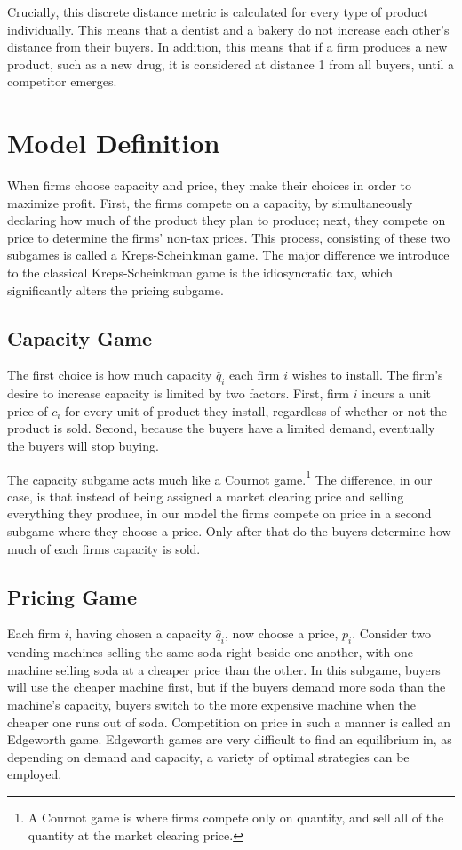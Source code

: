 \documentclass[11pt]{article}
\begin{document}
Crucially, this discrete distance metric is calculated for every type of
product individually. This means that a dentist and a bakery do not increase
each other's distance from their buyers. In addition, this means that if a firm
produces a new product, such as a new drug, it is considered at distance 1 from
all buyers, until a competitor emerges.

\section{Model Definition}
When firms choose capacity and price, they make their choices in order to
maximize profit. First, the firms compete on a capacity, by simultaneously
declaring how much of the product they plan to produce; next, they compete on
price to determine the firms' non-tax prices. This process, consisting of these
two subgames is called a Kreps-Scheinkman game. The major difference we
introduce to the classical Kreps-Scheinkman game is the idiosyncratic tax,
which significantly alters the pricing subgame.

\subsection{Capacity Game}
The first choice is how much capacity $\hat q_i$ each firm $i$ wishes to
install. The firm's desire to increase capacity is limited by two factors.
First, firm $i$ incurs a unit price of $c_i$ for every unit of product they
install, regardless of whether or not the product is sold. Second, because the
buyers have a limited demand, eventually the buyers will stop buying.

The capacity subgame acts much like a Cournot game.\footnote{A Cournot game is
where firms compete only on quantity, and sell all of the quantity at the
market clearing price.} The difference, in our case, is that instead of being
assigned a market clearing price and selling everything they produce, in our
model the firms compete on price in a second subgame where they choose a price.
Only after that do the buyers determine how much of each firms capacity is
sold.

\subsection{Pricing Game}
Each firm $i$, having chosen a capacity $\hat q_i$, now choose a price, $p_i$.
Consider two vending machines selling the same soda right beside one another,
with one machine selling soda at a cheaper price than the other. In this
subgame, buyers will use the cheaper machine first, but if the buyers demand
more soda than the machine's capacity, buyers switch to the more expensive
machine when the cheaper one runs out of soda. Competition on price in such a
manner is called an Edgeworth game. Edgeworth games are very difficult to find
an equilibrium in, as depending on demand and capacity, a variety of optimal
strategies can be employed.
\end{document}
